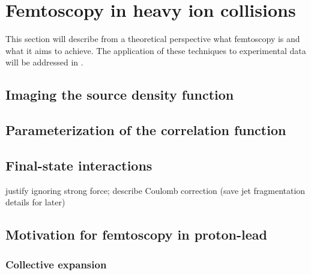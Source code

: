 

\section{Femtoscopy in heavy ion collisions}
This section will describe from a theoretical perspective what femtoscopy is and what it aims to achieve. The application of these techniques to experimental data will be addressed in .
\subsection{Imaging the source density function}
\subsection{Parameterization of the correlation function}
\subsection{Final-state interactions}
justify ignoring strong force; describe Coulomb correction (save jet fragmentation details for later)
\subsection{Motivation for femtoscopy in proton-lead}
\subsubsection{Collective expansion}

